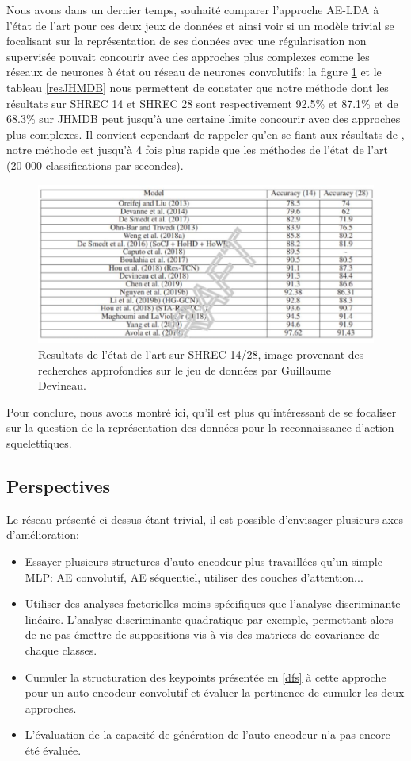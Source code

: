 Nous avons dans un dernier temps, souhaité comparer l'approche AE-LDA à l'état de l'art pour ces deux jeux de données et ainsi voir si un modèle trivial se focalisant sur la représentation de ses données avec une régularisation non supervisée pouvait concourir avec des approches plus complexes comme les réseaux de neurones à état ou réseau de neurones convolutifs: la figure \ref{fig:tabguillaume} et le tableau \ref{resJHMDB} nous permettent de constater que notre méthode dont les résultats sur SHREC 14 et SHREC 28 sont respectivement 92.5\% et 87.1\% et de 68.3\% sur JHMDB peut jusqu'à une certaine limite concourir avec des approches plus complexes. Il convient cependant de rappeler qu'en se fiant aux résultats de \cite{2019arXiv190709658Y}, notre méthode est jusqu'à 4 fois plus rapide que les méthodes de l'état de l'art (20 000 classifications par secondes).

\begin{figure}[H]
    \centering
    \includegraphics[width=0.8\linewidth]{Images/guillaume_TAB.png}
    \caption{Resultats de l'état de l'art sur SHREC 14/28, image provenant des recherches approfondies sur le jeu de données par Guillaume Devineau. }
    \label{fig:tabguillaume}
\end{figure}\textbf{}

Pour conclure, nous avons montré ici,  qu'il est plus qu’intéressant de se focaliser sur la question de la représentation des données pour la reconnaissance d'action squelettiques. 
\subsection{Perspectives}
Le réseau présenté ci-dessus étant trivial, il est possible d'envisager plusieurs axes d'amélioration:

\begin{itemize}
    \item Essayer plusieurs structures d’auto-encodeur plus travaillées qu'un simple MLP: AE convolutif, AE séquentiel, utiliser des couches d'attention...
    \item Utiliser des analyses factorielles moins spécifiques que l'analyse discriminante linéaire. L'analyse discriminante quadratique par exemple, permettant alors de ne pas émettre de suppositions vis-à-vis des matrices de covariance de chaque classes. 
    \item Cumuler la structuration des keypoints présentée en \ref{dfs} à cette approche pour un auto-encodeur convolutif et évaluer la pertinence de cumuler les deux approches.
    \item L'évaluation de la capacité de génération de l’auto-encodeur n'a pas encore été évaluée.
\end{itemize}

